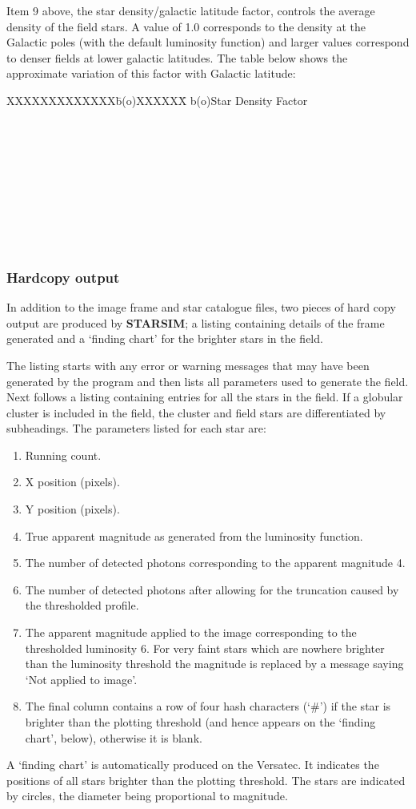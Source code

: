 Item 9 above, the star density/galactic latitude factor, controls the average
density of the field stars.
A value of 1.0 corresponds to the density at the Galactic poles (with the
default luminosity function) and larger values correspond to denser fields at
lower galactic latitudes.
The table below shows the approximate variation of this factor with Galactic
latitude:
\begin{tabbing}
XXXXXXXXXXXXX\=b(o)XXXXXX\=\kill
\>b(o)\>Star Density Factor\\
\\
\\
\\
\\
\\
\\
\\
\\
\\
\end{tabbing}
\subsubsection {Hardcopy output}
In addition to the image frame and star catalogue files, two pieces of hard copy
output are produced by {\bf STARSIM}; a listing containing details of the frame
generated and a `finding chart' for the brighter stars in the field.

The listing starts with any error or warning messages that may have been
generated by the program and then lists all parameters used to generate the
field.
Next follows a listing containing entries for all the stars in the field.
If a globular cluster is included in the field, the cluster and field stars are
differentiated by subheadings.
The parameters listed for each star are:
\begin{enumerate}
\item Running count.
\item X position (pixels).
\item Y position (pixels).
\item True apparent magnitude as generated from the luminosity function.
\item The number of detected photons corresponding to the apparent magnitude 4.
\item The number of detected photons after allowing for the truncation caused by
the thresholded profile.
\item The apparent magnitude applied to the image corresponding to the thresholded
luminosity 6.
For very faint stars which are nowhere brighter than the luminosity threshold
the magnitude is replaced by a message saying `Not applied to image'.
\item The final column contains a row of four hash characters (`\#') if the star
is brighter than the plotting threshold (and hence appears on the `finding
chart', below), otherwise it is blank.
\end{enumerate}
A `finding chart' is automatically produced on the Versatec.
It indicates the positions of all stars brighter than the plotting threshold.
The stars are indicated by circles, the diameter being proportional to
magnitude.
